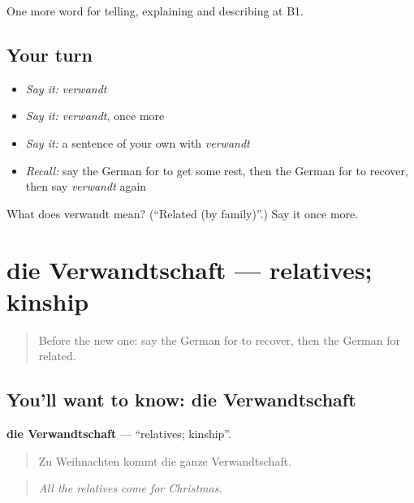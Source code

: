 \begin{grammarlens}[title={What you've built}]
One more word for telling, explaining and describing at B1.
\end{grammarlens}

\subsection*{Your turn}
\begin{itemize}
\raggedright
  \item \emph{Say it:} \emph{verwandt}
  \item \emph{Say it:} \emph{verwandt}, once more
  \item \emph{Say it:} a sentence of your own with \emph{verwandt}
  \item \emph{Recall:} say the German for to get some rest, then the German for to recover, then say \emph{verwandt} again
\end{itemize}

\begin{tcolorbox}[breakable,colback=teal!4,colframe=teal!35!black,title={Before you move on}]
What does verwandt mean? (\textquotedblleft{}Related (by family)\textquotedblright{}.) Say it once more.
\end{tcolorbox}
\section[die Verwandtschaft]{die Verwandtschaft — relatives; kinship}

\label{lesson:GE-C489-verwandtschaft}



\begin{quote}
Before the new one: say the German for to recover, then the German for related.
\end{quote}

\subsection*{You'll want to know: die Verwandtschaft}
\textbf{die Verwandtschaft} — \textquotedblleft{}relatives; kinship\textquotedblright{}.

\begin{quote}
Zu Weihnachten kommt die ganze Verwandtschaft.
\end{quote}

\begin{quote}
\emph{All the relatives come for Christmas.}
\end{quote}

